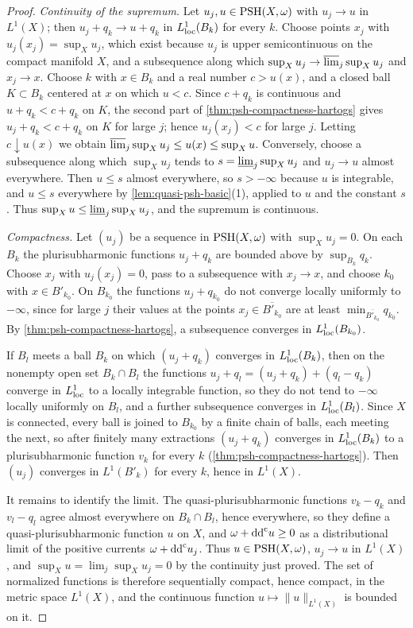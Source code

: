 \begin{proof}
\emph{Continuity of the supremum.} Let $u_j,u\in\mathrm{PSH}(X,\omega)$ with $u_j\to u$ in $L^1(X)$; then $u_j+q_k\to u+q_k$ in $L^1_{\mathrm{loc}}(B_k)$ for every $k$. Choose points $x_j$ with $u_j(x_j)=\sup_Xu_j$, which exist because $u_j$ is upper semicontinuous on the compact manifold $X$, and a subsequence along which $\sup_Xu_j\to\varlimsup_j\sup_Xu_j$ and $x_j\to x$. Choose $k$ with $x\in B_k$ and a real number $c>u(x)$, and a closed ball $K\subset B_k$ centered at $x$ on which $u<c$. Since $c+q_k$ is continuous and $u+q_k<c+q_k$ on $K$, the second part of \cref{thm:psh-compactness-hartogs} gives $u_j+q_k<c+q_k$ on $K$ for large $j$; hence $u_j(x_j)<c$ for large $j$. Letting $c\downarrow u(x)$ we obtain $\varlimsup_j\sup_Xu_j\leq u(x)\leq\sup_Xu$. Conversely, choose a subsequence along which $\sup_Xu_j$ tends to $s=\varliminf_j\sup_Xu_j$ and $u_j\to u$ almost everywhere. Then $u\leq s$ almost everywhere, so $s>-\infty$ because $u$ is integrable, and $u\leq s$ everywhere by \cref{lem:quasi-psh-basic}(1), applied to $u$ and the constant $s$. Thus $\sup_Xu\leq\varliminf_j\sup_Xu_j$, and the supremum is continuous.

\emph{Compactness.} Let $(u_j)$ be a sequence in $\mathrm{PSH}(X,\omega)$ with $\sup_Xu_j=0$. On each $B_k$ the plurisubharmonic functions $u_j+q_k$ are bounded above by $\sup_{B_k}q_k$. Choose $x_j$ with $u_j(x_j)=0$, pass to a subsequence with $x_j\to x$, and choose $k_0$ with $x\in B'_{k_0}$. On $B_{k_0}$ the functions $u_j+q_{k_0}$ do not converge locally uniformly to $-\infty$, since for large $j$ their values at the points $x_j\in\overline{B'_{k_0}}$ are at least $\min_{\overline{B'_{k_0}}}q_{k_0}$. By \cref{thm:psh-compactness-hartogs}, a subsequence converges in $L^1_{\mathrm{loc}}(B_{k_0})$.

If $B_l$ meets a ball $B_k$ on which $(u_j+q_k)$ converges in $L^1_{\mathrm{loc}}(B_k)$, then on the nonempty open set $B_k\cap B_l$ the functions $u_j+q_l=(u_j+q_k)+(q_l-q_k)$ converge in $L^1_{\mathrm{loc}}$ to a locally integrable function, so they do not tend to $-\infty$ locally uniformly on $B_l$, and a further subsequence converges in $L^1_{\mathrm{loc}}(B_l)$. Since $X$ is connected, every ball is joined to $B_{k_0}$ by a finite chain of balls, each meeting the next, so after finitely many extractions $(u_j+q_k)$ converges in $L^1_{\mathrm{loc}}(B_k)$ to a plurisubharmonic function $v_k$ for every $k$ (\cref{thm:psh-compactness-hartogs}). Then $(u_j)$ converges in $L^1(B'_k)$ for every $k$, hence in $L^1(X)$.

It remains to identify the limit. The quasi-plurisubharmonic functions $v_k-q_k$ and $v_l-q_l$ agree almost everywhere on $B_k\cap B_l$, hence everywhere, so they define a quasi-plurisubharmonic function $u$ on $X$, and $\omega+\mathrm{dd}^{\mathrm{c}} u\geq0$ as a distributional limit of the positive currents $\omega+\mathrm{dd}^{\mathrm{c}} u_j$. Thus $u\in\mathrm{PSH}(X,\omega)$, $u_j\to u$ in $L^1(X)$, and $\sup_Xu=\lim_j\sup_Xu_j=0$ by the continuity just proved. The set of normalized functions is therefore sequentially compact, hence compact, in the metric space $L^1(X)$, and the continuous function $u\mapsto\|u\|_{L^1(X)}$ is bounded on it.
\end{proof}

